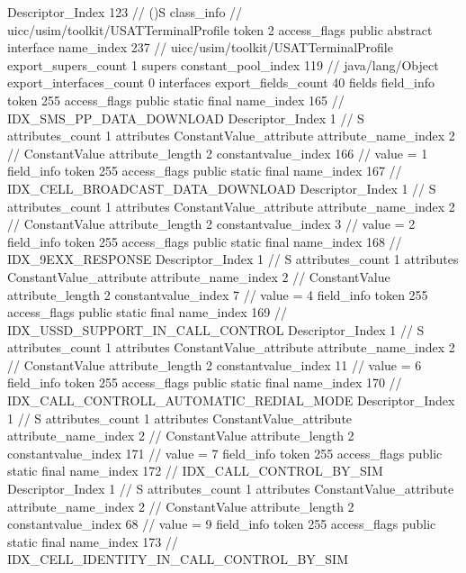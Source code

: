 {{{{{					Descriptor_Index	123		// ()S
				}
			}
		}
		class_info {		// uicc/usim/toolkit/USATTerminalProfile
			token	2
			access_flags	public abstract interface
			name_index	237		// uicc/usim/toolkit/USATTerminalProfile
			export_supers_count	1
			supers {
				constant_pool_index	119		// java/lang/Object
			}
			export_interfaces_count	0
			interfaces {
			}
			export_fields_count	40
			fields {
			field_info {
				token	255
				access_flags	public static final
				name_index	165		// IDX_SMS_PP_DATA_DOWNLOAD
				Descriptor_Index	1		// S
				attributes_count	1
				attributes {
				ConstantValue_attribute {
					attribute_name_index	2		// ConstantValue
					attribute_length	2
					constantvalue_index	166		// value = 1
				}
				}
			}
			field_info {
				token	255
				access_flags	public static final
				name_index	167		// IDX_CELL_BROADCAST_DATA_DOWNLOAD
				Descriptor_Index	1		// S
				attributes_count	1
				attributes {
				ConstantValue_attribute {
					attribute_name_index	2		// ConstantValue
					attribute_length	2
					constantvalue_index	3		// value = 2
				}
				}
			}
			field_info {
				token	255
				access_flags	public static final
				name_index	168		// IDX_9EXX_RESPONSE
				Descriptor_Index	1		// S
				attributes_count	1
				attributes {
				ConstantValue_attribute {
					attribute_name_index	2		// ConstantValue
					attribute_length	2
					constantvalue_index	7		// value = 4
				}
				}
			}
			field_info {
				token	255
				access_flags	public static final
				name_index	169		// IDX_USSD_SUPPORT_IN_CALL_CONTROL
				Descriptor_Index	1		// S
				attributes_count	1
				attributes {
				ConstantValue_attribute {
					attribute_name_index	2		// ConstantValue
					attribute_length	2
					constantvalue_index	11		// value = 6
				}
				}
			}
			field_info {
				token	255
				access_flags	public static final
				name_index	170		// IDX_CALL_CONTROLL_AUTOMATIC_REDIAL_MODE
				Descriptor_Index	1		// S
				attributes_count	1
				attributes {
				ConstantValue_attribute {
					attribute_name_index	2		// ConstantValue
					attribute_length	2
					constantvalue_index	171		// value = 7
				}
				}
			}
			field_info {
				token	255
				access_flags	public static final
				name_index	172		// IDX_CALL_CONTROL_BY_SIM
				Descriptor_Index	1		// S
				attributes_count	1
				attributes {
				ConstantValue_attribute {
					attribute_name_index	2		// ConstantValue
					attribute_length	2
					constantvalue_index	68		// value = 9
				}
				}
			}
			field_info {
				token	255
				access_flags	public static final
				name_index	173		// IDX_CELL_IDENTITY_IN_CALL_CONTROL_BY_SIM
}}}}}
